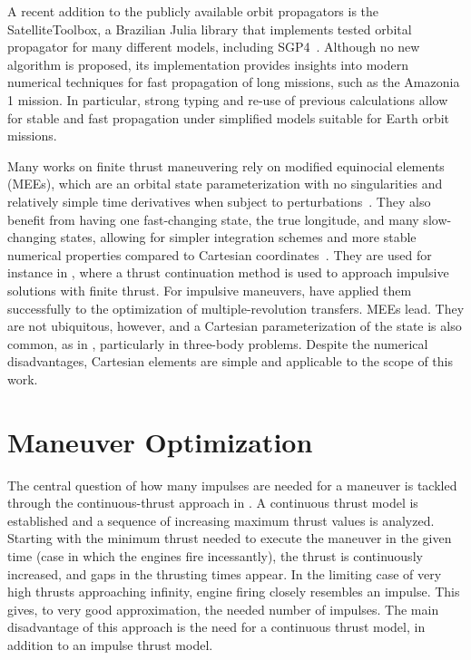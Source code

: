 A recent addition to the publicly available orbit propagators is the SatelliteToolbox, a Brazilian Julia library that implements tested orbital propagator for many different models, including SGP4~\cite{satellitetoolbox}. Although no new algorithm is proposed, its implementation provides insights into modern numerical techniques for fast propagation of long missions, such as the Amazonia 1 mission. In particular, strong typing and re-use of previous calculations allow for stable and fast propagation under simplified models suitable for Earth orbit missions.\

Many works on finite thrust maneuvering rely on modified equinocial elements (MEEs), which are an orbital state parameterization with no singularities and relatively simple time derivatives when subject to perturbations~\cite{mod_equinoctial_els}. They also benefit from having one fast-changing state, the true longitude, and many slow-changing states, allowing for simpler integration schemes and more stable numerical properties compared to Cartesian coordinates~\cite{Conway_2010}. They are used for instance in , where a thrust continuation method is used to approach impulsive solutions with finite thrust. For impulsive maneuvers,  have applied them successfully to the optimization of multiple-revolution transfers. MEEs lead. They are not ubiquitous, however, and a Cartesian parameterization of the state is also common, as in , particularly in three-body problems. Despite the numerical disadvantages, Cartesian elements are simple and applicable to the scope of this work.

\section{Maneuver Optimization}

The central question of how many impulses are needed for a maneuver is tackled through the continuous-thrust approach in . A continuous thrust model is established and a sequence of increasing maximum thrust values is analyzed. Starting with the minimum thrust needed to execute the maneuver in the given time (case in which the engines fire incessantly), the thrust is continuously increased, and gaps in the thrusting times appear. In the limiting case of very high thrusts approaching infinity, engine firing closely resembles an impulse. This gives, to very good approximation, the needed number of impulses. The main disadvantage of this approach is the need for a continuous thrust model, in addition to an impulse thrust model. 

